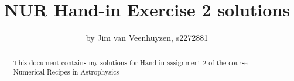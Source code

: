\documentclass[a4paper,10pt]{article}
\title{NUR Hand-in Exercise 2 solutions}
\author{by Jim van Veenhuyzen, s2272881}
\begin{document}
\maketitle

\begin{abstract}
This document contains my solutions for Hand-in assignment 2 of the course Numerical Recipes in Astrophysics
\end{abstract}




\end{document}
